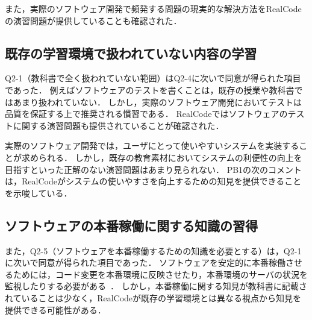 
また，実際のソフトウェア開発で頻発する問題の現実的な解決方法をRealCodeの演習問題が提供していることも確認された．




\subsection*{既存の学習環境で扱われていない内容の学習}

Q2-1（教科書で全く扱われていない範囲）はQ2-4に次いで同意が得られた項目であった．
例えばソフトウェアのテストを書くことは，既存の授業や教科書ではあまり扱われていない．
しかし，実際のソフトウェア開発においてテストは品質を保証する上で推奨される慣習である．
RealCodeではソフトウェアのテストに関する演習問題も提供されていることが確認された．



実際のソフトウェア開発では，ユーザにとって使いやすいシステムを実装することが求められる．
しかし，既存の教育素材においてシステムの利便性の向上を目指すといった正解のない演習問題はあまり見られない．
PB1の次のコメントは，RealCodeがシステムの使いやすさを向上するための知見を提供できることを示唆している．





\subsection*{ソフトウェアの本番稼働に関する知識の習得}

また，Q2-5（ソフトウェアを本番稼働するための知識を必要とする）は，Q2-1に次いで同意が得られた項目であった．
ソフトウェアを安定的に本番稼働させるためには，コード変更を本番環境に反映させたり，本番環境のサーバの状況を監視したりする必要がある~\cite{carzaniga1998characterization}．
しかし，本番稼働に関する知見が教科書に記載されていることは少なく，RealCodeが既存の学習環境とは異なる視点から知見を提供できる可能性がある．




























